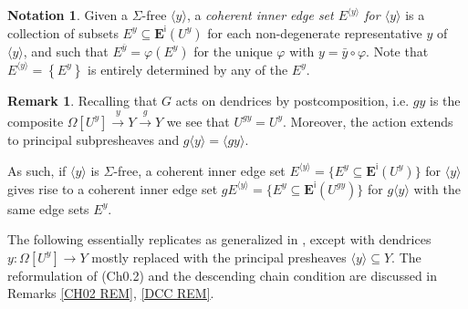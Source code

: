 \documentclass[a4paper,10pt
,draft
]{article}%
\numberwithin{equation}{section}
\numberwithin{figure}{section}
\theoremstyle{definition} %
\newtheorem{remark}[equation]{Remark}%
\newtheorem{notation}[equation]{Notation}%
\newcommand{\1}{\ensuremath{\mathbbm 1}}%
\begin{document}
\begin{notation}
	Given a $\Sigma$-free $\langle y \rangle$,
	a \emph{coherent inner edge set $E^{\langle y \rangle}$ for $\langle y \rangle$}
	is a collection of subsets 
	$E^y \subseteq \boldsymbol{E}^{\mathsf{i}}(U^y)$
	for each non-degenerate representative $y$ of $\langle y \rangle$, and such that 
	$E^{\bar{y}}  = \varphi \left(E^y \right)$
	for the unique $\varphi$ with $y= \bar{y} \circ \varphi$.
	Note that $E^{\langle y \rangle} = \left\{E^y \right\}$
	is entirely determined by any of the $E^y$.
\end{notation}


\begin{remark}
	Recalling that $G$ acts on dendrices by postcomposition, i.e.
	$gy$ is the composite
	$\Omega[U^y] \xrightarrow{y} Y \xrightarrow{g} Y$
	we see that $U^{gy} = U^{y}$.
	Moreover, the action extends to principal subpresheaves and
	$g \langle y \rangle = \langle g y \rangle$.
	
	As such, if $\langle y\rangle$ is $\Sigma$-free, a coherent inner edge set 
	$E^{\langle y \rangle} = \{E^y \subseteq \boldsymbol{E}^{\mathsf{i}}(U^y)\}$
	for $\langle y \rangle$
	gives rise to a coherent inner edge set 
	$g E^{\langle y \rangle} = \{E^y \subseteq \boldsymbol{E}^{\mathsf{i}}(U^{gy})\}$
	for $g\langle y \rangle$
	with the same edge sets $E^y$.
\end{remark}



The following essentially replicates \cite[Def. 3.1]{BP_edss} as generalized in \cite[Rem. 3.7]{BP_edss},
except with dendrices
$y \colon \Omega[U^y] \to Y$
mostly replaced with the principal presheaves
$\langle y \rangle \subseteq Y$. 
The reformulation of (Ch0.2) and the descending chain condition
are discussed in Remarks \ref{CH02 REM}, \ref{DCC REM}.
\end{document}
